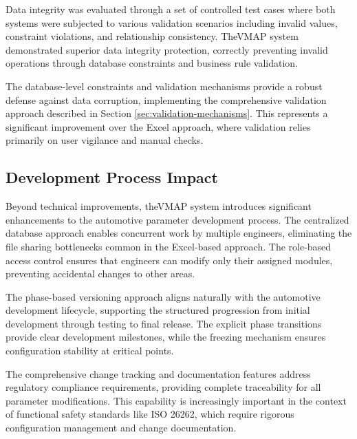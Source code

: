 Data integrity was evaluated through a set of controlled test cases where both systems were subjected to various validation scenarios including invalid values, constraint violations, and relationship consistency. The\ac{VMAP} system demonstrated superior data integrity protection, correctly preventing invalid operations through database constraints and business rule validation.

The database-level constraints and validation mechanisms provide a robust defense against data corruption, implementing the comprehensive validation approach described in Section \ref{sec:validation-mechanisms}. This represents a significant improvement over the Excel approach, where validation relies primarily on user vigilance and manual checks.

\subsection{Development Process Impact}
\label{subsec:development-process-impact}

Beyond technical improvements, the\ac{VMAP} system introduces significant enhancements to the automotive parameter development process. The centralized database approach enables concurrent work by multiple engineers, eliminating the file sharing bottlenecks common in the Excel-based approach. The role-based access control ensures that engineers can modify only their assigned modules, preventing accidental changes to other areas.

The phase-based versioning approach aligns naturally with the automotive development lifecycle, supporting the structured progression from initial development through testing to final release. The explicit phase transitions provide clear development milestones, while the freezing mechanism ensures configuration stability at critical points.

The comprehensive change tracking and documentation features address regulatory compliance requirements, providing complete traceability for all parameter modifications. This capability is increasingly important in the context of functional safety standards like ISO 26262, which require rigorous configuration management and change documentation.


